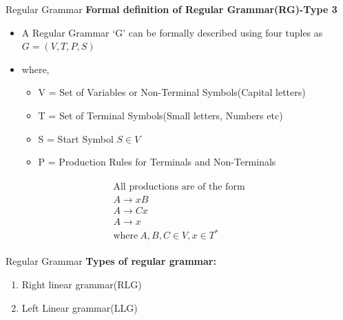\documentclass{beamer}
\begin{document}
\begin{frame}{Regular Grammar}
	\textbf{Formal definition of Regular Grammar(RG)-Type 3}
	\begin{itemize}
		\item A Regular Grammar ‘G’ can be formally described using four tuples as $G = (V, T, P, S)$
		\item where,
		\begin{itemize}
			\item V = Set of Variables or Non-Terminal Symbols(Capital letters)
			\item T = Set of Terminal Symbols(Small letters, Numbers etc)
			\item S = Start Symbol $S\in V$
			\item P = Production Rules for Terminals and Non-Terminals

		\end{itemize}
	\end{itemize}
		\begin{equation*}
		\begin{split}\begin{array}{c}
				\mbox{All productions are of the form} \\
				A \rightarrow xB \\
				A \rightarrow Cx \\
				A \rightarrow x \\
				\mbox{where}\ A,B,C \in V, x \in T^*
		\end{array}\end{split}
	\end{equation*}
\end{frame}
\begin{frame}{Regular Grammar}
	\textbf{Types of regular grammar:}
	\begin{enumerate}
		\item Right linear grammar(RLG)
		\item Left Linear grammar(LLG)
	\end{enumerate}
\end{frame}
\end{document}
